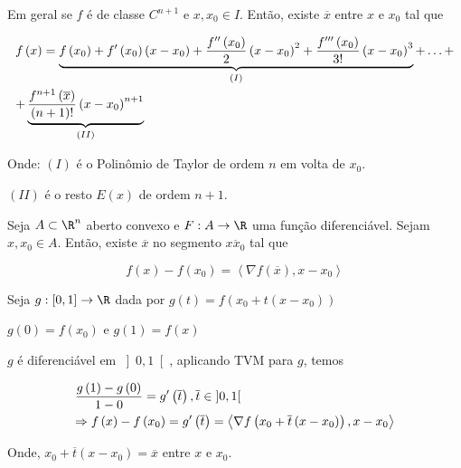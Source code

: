 \documentclass[11pt, oneside, a4paper]{gsm-l}
\begin{document}
Em geral se $f$ é de classe $C^{n+1}$ e $x,x_0 \in I$. Então, existe $\overline x$ entre $x$ e $x_0$ tal que

\[
\begin{gathered}
  f\left( x \right) = \underbrace {f\left( {x_0 } \right) + f'\left( {x_0 } \right)\left( {x - x_0 } \right) + \frac{{f''\left( {x_0 } \right)}}
{2}\left( {x - x_0 } \right)^2  + \frac{{f'''\left( {x_0 } \right)}}
{{3!}}\left( {x - x_0 } \right)^3 }_{\left( I \right)} + \ldots + \hfill \\
  + \underbrace {\frac{{f^{n + 1} \left( {\overline x } \right)}}{{\left( {n + 1} \right)!}}\left( {x - x_0 } \right)^{n + 1} }_{\left( {II} \right)} \hfill \\ 
\end{gathered} 
\]

Onde: $(I)$ é o Polin\^omio de Taylor de ordem $n$ em volta de $x_0$.

$(II)$ é o resto $E(x)$ de ordem $n+1$.

\begin{teo} \label{tvm2}
\begin{sloppypar}
Seja $A \subset \R^n$ aberto convexo e ${F:A \to \R}$ uma função diferenciável. Sejam $x,x_0 \in A$. Então, existe $\overline x$ no segmento $\overline {xx_0}$ tal que
\end{sloppypar}

\[
f\left( x \right) - f\left( {x_0 } \right) = \left\langle {\nabla f\left( {\overline x } \right),x - x_0 } \right\rangle
\]

\end{teo}

\begin{dem}
    Seja $g:\left[ {0,1} \right] \to \R$ dada por $g\left( t \right) = f\left( {x_0  + t\left( {x - x_0 } \right)} \right)$

    $g\left( 0 \right) = f\left( {x_0 } \right)$ e $g\left( 1 \right) = f\left( x \right)$

$g$ é diferenciável em $\left] {0,1} \right[$, aplicando TVM para $g$, temos

\[
\begin{gathered}
\frac{{g\left( 1 \right) - g\left( 0 \right)}}
{{1 - 0}} = g'\left( {\overline t } \right),\overline t  \in \left] {0,1} \right[ \hfill \\
   \Rightarrow f\left( x \right) - f\left( {x_0 } \right) = g'\left( {\overline t } \right) = \left\langle {\nabla f\left( {x_0  + \overline t \left( {x - x_0 } \right)} \right),x - x_0 } \right\rangle  \hfill \\
\end{gathered}
\]

    Onde, $x_0  + \overline t \left( {x - x_0 } \right) = \overline x$ entre $x$ e $x_0$.
\end{dem}
\end{document}
